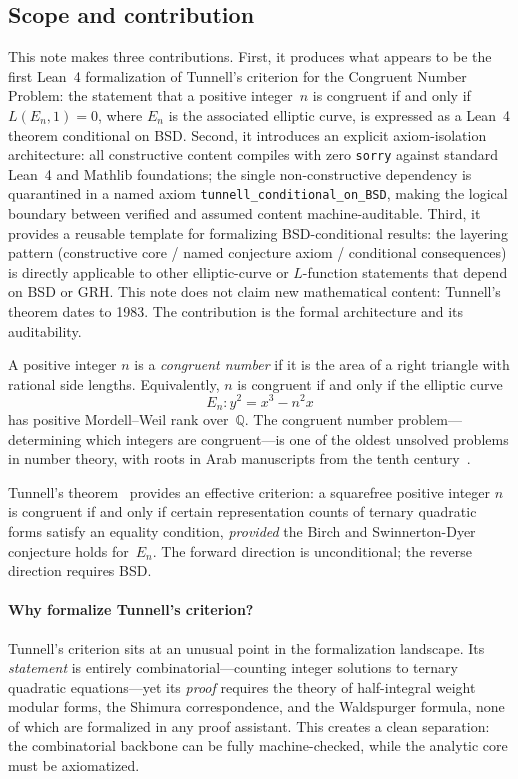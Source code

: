 \documentclass[11pt,a4paper]{article}
\theoremstyle{definition}
\newcommand{\Q}{\mathbb{Q}}
\newcommand{\En}{E_n}
\begin{document}
\subsection*{Scope and contribution}
\label{sec:scope-and-contribution}

This note makes three contributions.  First, it produces what
appears to be the first Lean~4 formalization of Tunnell's criterion
for the Congruent Number Problem: the statement that a positive
integer~$n$ is congruent if and only if $L(E_n, 1) = 0$, where
$E_n$ is the associated elliptic curve, is expressed as a Lean~4
theorem conditional on BSD\@.  Second, it introduces an explicit
axiom-isolation architecture: all constructive content compiles
with zero \texttt{sorry} against standard Lean~4 and Mathlib
foundations; the single non-constructive dependency is quarantined
in a named axiom \texttt{tunnell\_conditional\_on\_BSD}, making
the logical boundary between verified and assumed content
machine-auditable.  Third, it provides a reusable template for
formalizing BSD-conditional results: the layering pattern
(constructive core / named conjecture axiom / conditional
consequences) is directly applicable to other elliptic-curve or
$L$-function statements that depend on BSD or GRH\@.  This note
does not claim new mathematical content: Tunnell's theorem dates
to 1983.  The contribution is the formal architecture and its
auditability.

\medskip

A positive integer $n$ is a \emph{congruent number} if it is the area
of a right triangle with rational side lengths.  Equivalently, $n$ is
congruent if and only if the elliptic curve
\[
  \En : y^2 = x^3 - n^2 x
\]
has positive Mordell--Weil rank over~$\Q$.  The congruent number
problem---determining which integers are congruent---is one of the
oldest unsolved problems in number theory, with roots in Arab
manuscripts from the tenth century~\cite{Koblitz1993}.

Tunnell's theorem~\cite{Tunnell1983} provides an effective criterion:
a squarefree positive integer $n$ is congruent if and only if certain
representation counts of ternary quadratic forms satisfy an equality
condition, \emph{provided} the Birch and Swinnerton-Dyer conjecture
holds for~$\En$.  The forward direction is unconditional; the reverse
direction requires BSD.

\paragraph{Why formalize Tunnell's criterion?}
Tunnell's criterion sits at an unusual point in the formalization
landscape.  Its \emph{statement} is entirely combinatorial---counting
integer solutions to ternary quadratic equations---yet its
\emph{proof} requires the theory of half-integral weight modular
forms, the Shimura correspondence, and the Waldspurger formula, none
of which are formalized in any proof assistant.  This creates a clean
separation: the combinatorial backbone can be fully machine-checked,
while the analytic core must be axiomatized.
\end{document}
